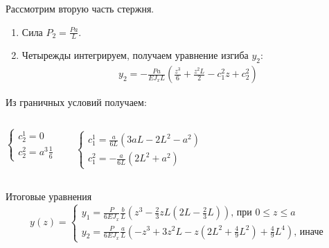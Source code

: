 \documentclass[ignoreonframetext,unicode]{beamer}
\begin{document}
\begin{frame}{}
	Рассмотрим вторую часть стержня. 
	\begin{enumerate}
		\item Сила $P_2 = \frac{P a}{L}$.

		\item Четырежды интегрируем, получаем уравнение изгиба  $y_2$: 
		\begin{gather*}
			y_2 = - \frac{P a}{E J_{x} L} \left(\frac{z^3}{6} + \frac{z^2 L}{2} - c_1^2 z + c_2^2\right)
		\end{gather*}
	\end{enumerate}

	Из граничных условий получаем:
\begin{columns}
	\begin{block}{}	\vspace*{2.0mm}
		\[
		\begin{cases}
			c_2^1 = 0\\
			c_2^2 = a^3 \frac{1}{6}
		\end{cases}
		\]
	\end{block}
	\begin{block}{}	\vspace*{-2.0mm}
		\begin{gather*}
		\begin{cases}
			c_1^1 = \frac{a}{6 L} (3 a L - 2 L^2 - a^2)\\
			c_1^2 = -\frac{a}{6 L} (2 L^2 + a^2)
		\end{cases}
		\end{gather*}
	\end{block}
\end{columns}

\begin{block}{Итоговые уравнения}
	\[
	y(z) = 
	\begin{cases}
		y_1 = \frac{P}{6 E J_{x}} \frac{b}{L} (z^3 - \frac{2}{3} z L(2 L - \frac{2}{3}L))\mbox{, при } 0 \leqslant z \leqslant a\\
		y_2 = \frac{P}{6 E J_{x}} \frac{a}{L} (-z^3 + 3 z^2 L - z(2 L^2 + \frac{4}{9} L^2) + \frac{4}{9}L^4)\mbox{, иначе }
	\end{cases}
	\]
\end{block}
\end{frame}
\end{document}
